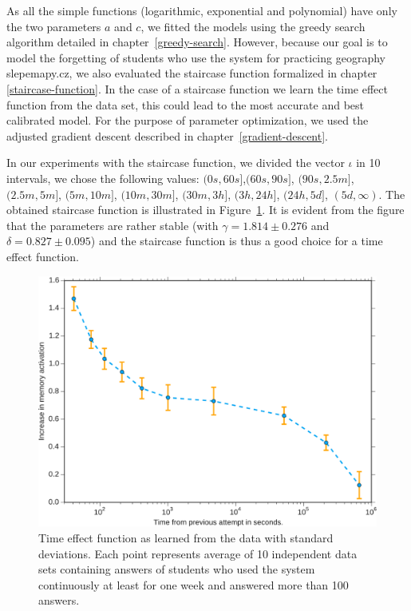 As all the simple functions (logarithmic, exponential and polynomial) have only the two parameters $a$ and $c$, we fitted the models using the greedy search algorithm detailed in chapter~\ref{greedy-search}. However, because our goal is to model the forgetting of students who use the system for practicing geography slepemapy.cz, we also evaluated the staircase function formalized in chapter \ref{staircase-function}. In the case of a staircase function we learn the time effect function from the data set, this could lead to the most accurate and best calibrated model. For the purpose of parameter optimization, we used the adjusted gradient descent described in chapter~\ref{gradient-descent}.

In our experiments with the staircase function, we divided the vector $\iota$ in 10 intervals, we chose the following values: $(0s, 60s]$,$(60s, 90s]$, $(90s, 2.5m]$, $(2.5m, 5m]$, $(5m, 10m]$, $(10m, 30m]$, $(30m, 3h]$, $(3h, 24h]$, $(24h, 5d]$, $(5d, \infty)$. The obtained staircase function is illustrated in Figure~\ref{learned-time-effect-function}. It is evident from the figure that the parameters are rather stable (with $\gamma = 1.814 \pm 0.276$ and $\delta = 0.827 \pm 0.095$) and the staircase function is thus a good choice for a time effect function.

\begin{figure}[htbp]
  \centering
  \includegraphics[width=\textwidth]{img/learned-time-effect-function}
  \caption{Time effect function as learned from the data with standard deviations. Each point represents average of 10 independent data sets containing answers of students who used the system continuously at least for one week and answered more than 100 answers.}
  \label{learned-time-effect-function}
\end{figure}

